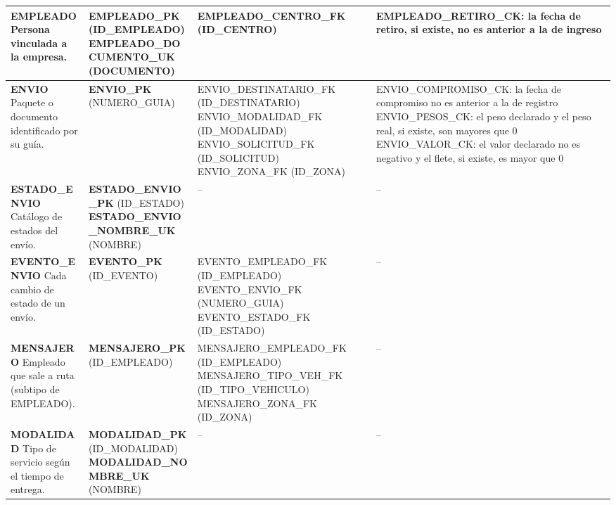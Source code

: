 {\begin{longtable}{|L{3.0cm}|L{3.9cm}|L{3.8cm}|L{3.6cm}|}
\textbf{EMPLEADO} \newline Persona vinculada a la empresa. & \textbf{EMPLEADO\_PK} (ID\_EMPLEADO) \newline \textbf{EMPLEADO\_DOCUMENTO\_UK} (DOCUMENTO) & EMPLEADO\_CENTRO\_FK (ID\_CENTRO) & EMPLEADO\_RETIRO\_CK: la fecha de retiro, si existe, no es anterior a la de ingreso \\ \hline
\textbf{ENVIO} \newline Paquete o documento identificado por su guía. & \textbf{ENVIO\_PK} (NUMERO\_GUIA) & ENVIO\_DESTINATARIO\_FK (ID\_DESTINATARIO) \newline ENVIO\_MODALIDAD\_FK (ID\_MODALIDAD) \newline ENVIO\_SOLICITUD\_FK (ID\_SOLICITUD) \newline ENVIO\_ZONA\_FK (ID\_ZONA) & ENVIO\_COMPROMISO\_CK: la fecha de compromiso no es anterior a la de registro \newline ENVIO\_PESOS\_CK: el peso declarado y el peso real, si existe, son mayores que 0 \newline ENVIO\_VALOR\_CK: el valor declarado no es negativo y el flete, si existe, es mayor que 0 \\ \hline
\textbf{ESTADO\_ENVIO} \newline Catálogo de estados del envío. & \textbf{ESTADO\_ENVIO\_PK} (ID\_ESTADO) \newline \textbf{ESTADO\_ENVIO\_NOMBRE\_UK} (NOMBRE) & -- & -- \\ \hline
\textbf{EVENTO\_ENVIO} \newline Cada cambio de estado de un envío. & \textbf{EVENTO\_PK} (ID\_EVENTO) & EVENTO\_EMPLEADO\_FK (ID\_EMPLEADO) \newline EVENTO\_ENVIO\_FK (NUMERO\_GUIA) \newline EVENTO\_ESTADO\_FK (ID\_ESTADO) & -- \\ \hline
\textbf{MENSAJERO} \newline Empleado que sale a ruta (subtipo de EMPLEADO). & \textbf{MENSAJERO\_PK} (ID\_EMPLEADO) & MENSAJERO\_EMPLEADO\_FK (ID\_EMPLEADO) \newline MENSAJERO\_TIPO\_VEH\_FK (ID\_TIPO\_VEHICULO) \newline MENSAJERO\_ZONA\_FK (ID\_ZONA) & -- \\ \hline
\textbf{MODALIDAD} \newline Tipo de servicio según el tiempo de entrega. & \textbf{MODALIDAD\_PK} (ID\_MODALIDAD) \newline \textbf{MODALIDAD\_NOMBRE\_UK} (NOMBRE) & -- & -- \\ \hline

\end{longtable}}
